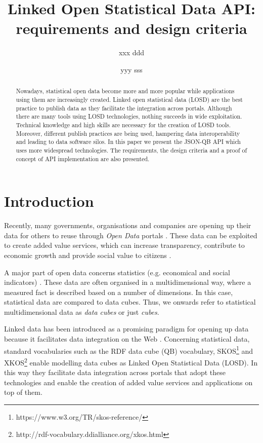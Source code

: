 \documentclass{llncs}
\begin{document}
\title{Linked Open Statistical Data API: requirements and design criteria}

\author{xxx ddd \and yyy sss}

\maketitle

\begin{abstract}

Nowadays, statistical open data become more and more popular while applications using them are increasingly created. Linked open statistical data (LOSD) are the best practice to publish data as they facilitate the integration across portals. Although there are many tools using LOSD technologies, nothing succeeds in wide exploitation. Technical knowledge and high skills are necessary for the creation of LOSD tools. Moreover, different publish practices are being used, hampering data interoperability and leading to data software silos. In this paper we present the JSON-QB API which uses more widespread technologies. The requirements, the design criteria and a proof of concept of API implementation are also presented.  

\end{abstract}

\section{Introduction}\label{sec:intro}

Recently, many governments, organisations and companies are opening up their data for others to reuse through \textit{Open Data} portals  \cite{Kalampokis:2011:IJWET}. These data can be exploited to create added value services, which can increase transparency, contribute to economic growth and provide social value to citizens \cite{Janssen:2012}.

A major part of open data concerns statistics (e.g. economical and social indicators) \cite{Capadisli:2013}. These data are often organised in a multidimensional way, where a measured fact is described based on a number of dimensions. In this case, statistical data are compared to data cubes. Thus, we onwards refer to statistical multidimensional data as \textit{data cubes} or just \textit{cubes}.

Linked data has been introduced as a promising paradigm for opening up data because it facilitates data integration on the Web \cite{Bizer:2009}. Concerning statistical data, standard vocabularies such as the RDF data cube (QB) vocabulary\cite{Cyganiak:2014:W3C}, SKOS\footnote{https://www.w3.org/TR/skos-reference/} and XKOS\footnote{http://rdf-vocabulary.ddialliance.org/xkos.html} enable modelling data cubes as Linked Open Statistical Data (LOSD). In this way they facilitate data integration across portals that adopt these technologies and enable the creation of added value services and applications on top of them.
\end{document}
